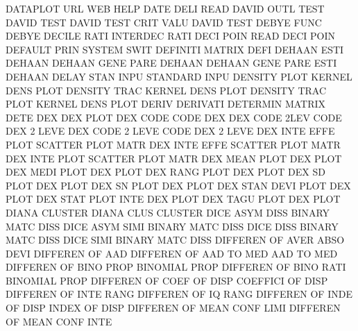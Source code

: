DATAPLOT URL                            WEB      HELP
DATE     DELI                           READ
DAVID    OUTL TEST                      DAVID    TEST
DAVID    TEST CRIT VALU                 DAVID    TEST
DEBYE    FUNC                           DEBYE
DECILE   RATI                           INTERDEC RATI
DECI     POIN                           READ     DECI POIN 
DEFAULT  PRIN                           SYSTEM   SWIT
DEFINITI                                MATRIX   DEFI
DEHAAN   ESTI                           DEHAAN
DEHAAN   GENE PARE                      DEHAAN
DEHAAN   GENE PARE ESTI                 DEHAAN
DELAY    STAN INPU                      STANDARD INPU
DENSITY  PLOT                           KERNEL   DENS PLOT
DENSITY  TRAC                           KERNEL   DENS PLOT
DENSITY  TRAC PLOT                      KERNEL   DENS PLOT
DERIV                                   DERIVATI
DETERMIN                                MATRIX   DETE
DEX                                     DEX      PLOT
DEX      CODE                           CODE     DEX
DEX      CODE 2LEV                      CODE     DEX  2    LEVE
DEX      CODE 2    LEVE                 CODE     DEX  2    LEVE
DEX      INTE EFFE PLOT                 SCATTER  PLOT MATR
DEX      INTE EFFE                      SCATTER  PLOT MATR
DEX      INTE PLOT                      SCATTER  PLOT MATR
DEX      MEAN PLOT                      DEX      PLOT
DEX      MEDI PLOT                      DEX      PLOT
DEX      RANG PLOT                      DEX      PLOT
DEX      SD   PLOT                      DEX      PLOT
DEX      SN   PLOT                      DEX      PLOT
DEX      STAN DEVI PLOT                 DEX      PLOT
DEX      STAT PLOT INTE                 DEX      PLOT
DEX      TAGU PLOT                      DEX      PLOT
DIANA                                   CLUSTER
DIANA    CLUS                           CLUSTER
DICE     ASYM DISS                      BINARY   MATC DISS
DICE     ASYM SIMI                      BINARY   MATC DISS
DICE     DISS                           BINARY   MATC DISS
DICE     SIMI                           BINARY   MATC DISS
DIFFEREN OF   AVER ABSO DEVI            DIFFEREN OF   AAD
DIFFEREN OF   AAD  TO   MED             AAD      TO   MED
DIFFEREN OF   BINO PROP                 BINOMIAL PROP
DIFFEREN OF   BINO RATI                 BINOMIAL PROP
DIFFEREN OF   COEF OF   DISP            COEFFICI OF   DISP
DIFFEREN OF   INTE RANG                 DIFFEREN OF   IQ   RANG
DIFFEREN OF   INDE OF   DISP            INDEX    OF   DISP
DIFFEREN OF   MEAN CONF LIMI            DIFFEREN OF   MEAN CONF INTE
